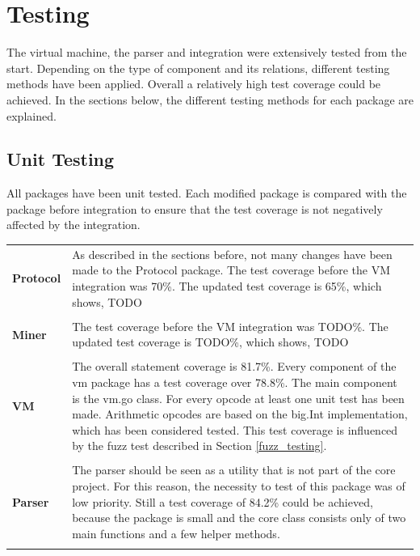 \section{Testing}
The virtual machine, the parser and integration were extensively tested from the start. Depending on the type of component and its relations, different testing methods have been applied. Overall a relatively high test coverage could be achieved. In the sections below, the different testing methods for each package are explained.

\subsection{Unit Testing}
All packages have been unit tested. Each modified package is compared with the package before integration to ensure that the test coverage is not negatively affected by the integration.

\begin{tabular}[t]{ p{3cm} p{12.5cm}}
\raggedright
\textbf{Protocol} &
As described in the sections before, not many changes have been made to the Protocol package. The test coverage before the VM integration was 70\%. The updated test coverage is 65\%, which shows, TODO  \\ \\
\textbf{Miner} &
The test coverage before the VM integration was TODO\%. The updated test coverage is TODO\%, which shows, TODO  \\ \\
\textbf{VM} &
The overall statement coverage is 81.7\%. Every component of the vm package has a test coverage over 78.8\%. The main component is the vm.go class. For every opcode at least one unit test has been made. Arithmetic opcodes are based on the big.Int implementation, which has been considered tested. This test coverage is influenced by the fuzz test described in Section \ref{fuzz_testing}. \\ \\
\textbf{Parser} &
The parser should be seen as a utility that is not part of the core project. For this reason, the necessity to test of this package was of low priority. Still a test coverage of 84.2\% could be achieved, because the package is small and the core class consists only of two main functions and a few helper methods. \\ \\
\end{tabular}
 
